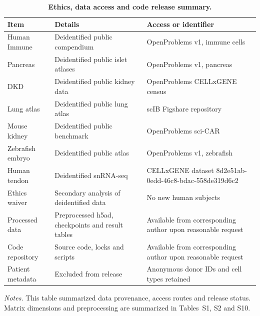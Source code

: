 \documentclass[11pt]{article}
\begin{document}
\FloatBarrier

\begin{table}[htbp]
\centering
\caption{\textbf{Ethics, data access and code release summary.}}
\label{tab:s14_ethics_data}
\scriptsize
\begin{tabularx}{\textwidth}{@{}L{0.22\textwidth} L{0.38\textwidth} Y@{}}
\toprule
\textbf{Item} & \textbf{Details} & \textbf{Access or identifier} \\
\midrule
Human Immune & Deidentified public compendium & OpenProblems v1, immune cells \\
Pancreas & Deidentified public islet atlases & OpenProblems v1, pancreas \\
DKD & Deidentified public kidney data & OpenProblems CELLxGENE census \\
Lung atlas & Deidentified public lung atlas & scIB Figshare repository \cite{Luecken2022IntegrationBenchmark} \\
Mouse kidney & Deidentified public benchmark & OpenProblems sci-CAR \cite{Cao2018sciCAR} \\
Zebrafish embryo & Deidentified public atlas & OpenProblems v1, zebrafish \\
Human tendon & Deidentified snRNA-seq & CELLxGENE dataset 8d2e51ab-0edd-46c8-bdac-558de319d6c2 \cite{Tendon202x} \\
Ethics waiver & Secondary analysis of deidentified data & No new human subjects \\
Processed data & Preprocessed h5ad, checkpoints and result tables & Available from corresponding author upon reasonable request \\
Code repository & Source code, locks and scripts & Available from corresponding author upon reasonable request \\
Patient metadata & Excluded from release & Anonymous donor IDs and cell types retained \\
\bottomrule
\end{tabularx}

\vspace{0.5em}
{\raggedright\scriptsize\textit{Notes.} This table summarized data provenance, access routes and release status. Matrix dimensions and preprocessing are summarized in Tables~S1, S2 and S10.\par}
\end{table}

\FloatBarrier
\end{document}
